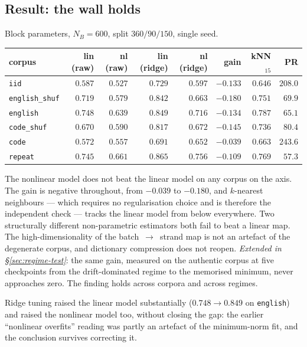 \subsection{Result: the wall holds}
\label{sec:idprobe-result}

Block parameters, $N_B=600$, split $360/90/150$, single seed.

\begin{center}
\begin{tabular}{lrrrrrrr}
\hline
corpus & lin (raw) & nl (raw) & lin (ridge) & nl (ridge) & gain & kNN$_{15}$ & PR \\
\hline
\texttt{iid}          & $0.587$ & $0.527$ & $0.729$ & $0.597$ & $-0.133$ & $0.646$ & $208.0$ \\
\texttt{english\_shuf}& $0.719$ & $0.579$ & $0.842$ & $0.663$ & $-0.180$ & $0.751$ & $69.9$ \\
\texttt{english}      & $0.748$ & $0.639$ & $0.849$ & $0.716$ & $-0.134$ & $0.787$ & $65.1$ \\
\texttt{code\_shuf}   & $0.670$ & $0.590$ & $0.817$ & $0.672$ & $-0.145$ & $0.736$ & $80.4$ \\
\texttt{code}         & $0.572$ & $0.557$ & $0.691$ & $0.652$ & $-0.039$ & $0.663$ & $243.6$ \\
\texttt{repeat}       & $0.745$ & $0.661$ & $0.865$ & $0.756$ & $-0.109$ & $0.769$ & $57.3$ \\
\hline
\end{tabular}
\end{center}

\begin{observation}
\label{obs:no-manifold}
The nonlinear model does not beat the linear model on any corpus on the axis.
The gain is negative throughout, from $-0.039$ to $-0.180$, and $k$-nearest
neighbours --- which requires no regularisation choice and is therefore the
independent check --- tracks the linear model from below everywhere. Two
structurally different non-parametric estimators both fail to beat a linear
map. The high-dimensionality of the batch~$\to$~strand map is not an artefact
of the degenerate corpus, and dictionary compression does not reopen.
\emph{Extended in \S\ref{sec:regime-test}}: the same gain, measured on the
authentic corpus at five checkpoints from the drift-dominated regime to the
memorised minimum, never approaches zero. The finding holds across corpora and
across regimes.
\end{observation}

Ridge tuning raised the linear model substantially ($0.748\to0.849$ on
\texttt{english}) and raised the nonlinear model too, without closing the gap:
the earlier ``nonlinear overfits'' reading was partly an artefact of the
minimum-norm fit, and the conclusion survives correcting it.

